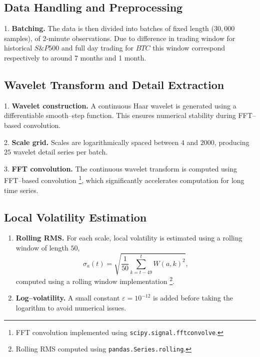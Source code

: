 \documentclass[pdflatex,sn-mathphys-num]{sn-jnl}%
\theoremstyle{thmstyleone}%
\theoremstyle{thmstyletwo}%
\theoremstyle{thmstylethree}%
\begin{document}
\subsection{Data Handling and Preprocessing}

1. \textbf{Batching.}  
   The data is then divided into batches of fixed length ($30{,}000$ samples), of 2‑minute observations. Due to difference in trading window for historical $S\&P500$ and full day trading for $BTC$ this window correspond respectively to around 7 months and 1 month.

\subsection{Wavelet Transform and Detail Extraction}

1. \textbf{Wavelet construction.}  
   A continuous Haar wavelet is generated using a differentiable smooth–step
   function. This ensures numerical stability during FFT–based convolution.

2. \textbf{Scale grid.}  
   Scales are logarithmically spaced between $4$ and $2000$, producing $25$
   wavelet detail series per batch.

3. \textbf{FFT convolution.}  
   The continuous wavelet transform is computed using FFT–based convolution%
   \footnote{FFT convolution implemented using \texttt{scipy.signal.fftconvolve}.},
   which significantly accelerates computation for long time series.

\subsection{Local Volatility Estimation}
\begin{enumerate}
    \item \textbf{Rolling RMS.}  
   For each scale, local volatility is estimated using a rolling window of
   length $50$, 
\[
   \sigma_a(t) = \sqrt{\frac{1}{50}\sum_{k=t-49}^{t} W(a,k)^2},
   \]
    computed using a rolling window implementation%
   \footnote{Rolling RMS computed using \texttt{pandas.Series.rolling}.}.
    \item \textbf{Log–volatility.}  
   A small constant $\varepsilon = 10^{-12}$ is added before taking the
   logarithm to avoid numerical issues.
\end{enumerate}
   
\end{document}
